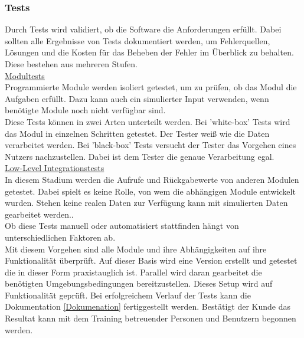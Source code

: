 \documentclass[12pt,a4paper]{article}
\begin{document}
\subsubsection{Tests}
\label{Tests}
Durch Tests wird validiert, ob die Software die Anforderungen erfüllt. Dabei sollten alle Ergebnisse von Tests dokumentiert werden, um Fehlerquellen, Lösungen und die Kosten für das Beheben der Fehler im Überblick zu behalten\cite{rakos1990software}.\\
Diese bestehen aus mehreren Stufen.\\
\underline{Modultests}\\
Programmierte Module werden isoliert getestet, um zu prüfen, ob das Modul die Aufgaben erfüllt. Dazu kann auch ein simulierter Input verwenden, wenn benötigte Module noch nicht verfügbar sind. \\
Diese Tests können in zwei Arten unterteilt werden. Bei 'white-box' Tests wird das Modul in einzelnen Schritten getestet. Der Tester weiß wie die Daten verarbeitet werden. Bei 'black-box' Tests versucht der Tester das Vorgehen eines Nutzers nachzustellen. Dabei ist dem Tester die genaue Verarbeitung egal\cite{rakos1990software}.\\
\underline{Low-Level Integrationstests}\\
In diesem Stadium werden die Aufrufe und Rückgabewerte von anderen Modulen getestet. Dabei spielt es keine Rolle, von wem die abhängigen Module entwickelt wurden. Stehen keine realen Daten zur Verfügung kann mit simulierten Daten gearbeitet werden.\cite{rakos1990software}.\\
Ob diese Tests manuell oder automatisiert stattfinden hängt von unterschiedlichen Faktoren ab.\\
\newline
Mit diesem Vorgehen sind alle Module und ihre Abhängigkeiten auf ihre Funktionalität überprüft. Auf dieser Basis wird eine Version erstellt und getestet die in dieser Form praxistauglich ist. Parallel wird daran gearbeitet die benötigten Umgebungsbedingungen bereitzustellen. Dieses Setup wird auf Funktionalität geprüft. Bei erfolgreichem Verlauf der Tests kann die Dokumentation \ref{Dokumenation} fertiggestellt werden.
Bestätigt der Kunde das Resultat kann mit dem Training betreuender Personen und Benutzern begonnen werden\cite{rakos1990software}.\\
\end{document}
